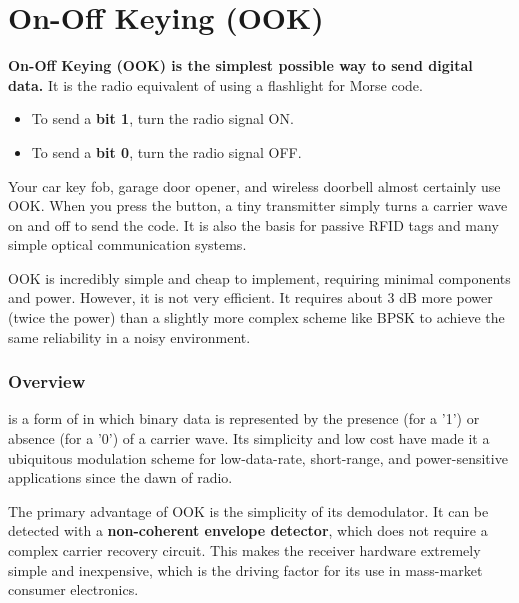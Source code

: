 
\chapter{On-Off Keying (OOK)}
\label{ch:ook}

\begin{nontechnical}
    \textbf{On-Off Keying (OOK) is the simplest possible way to send digital data.} It is the radio equivalent of using a flashlight for Morse code.

    \begin{itemize}
        \item To send a \textbf{bit 1}, turn the radio signal ON.
        \item To send a \textbf{bit 0}, turn the radio signal OFF.
    \end{itemize}

     Your car key fob, garage door opener, and wireless doorbell almost certainly use OOK. When you press the button, a tiny transmitter simply turns a carrier wave on and off to send the code. It is also the basis for passive RFID tags and many simple optical communication systems.

     OOK is incredibly simple and cheap to implement, requiring minimal components and power. However, it is not very efficient. It requires about 3 dB more power (twice the power) than a slightly more complex scheme like BPSK to achieve the same reliability in a noisy environment.
\end{nontechnical}


\subsection{Overview}

 is a form of  in which binary data is represented by the presence (for a '1') or absence (for a '0') of a carrier wave. Its simplicity and low cost have made it a ubiquitous modulation scheme for low-data-rate, short-range, and power-sensitive applications since the dawn of radio.

\begin{keyconcept}
    The primary advantage of OOK is the simplicity of its demodulator. It can be detected with a \textbf{non-coherent envelope detector}, which does not require a complex carrier recovery circuit. This makes the receiver hardware extremely simple and inexpensive, which is the driving factor for its use in mass-market consumer electronics.
\end{keyconcept}


